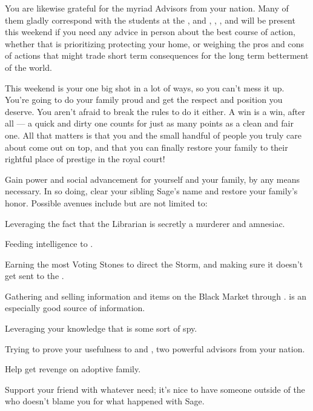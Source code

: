 \documentclass[char]{GL2020}
\begin{document}
You are likewise grateful for the myriad Advisors from your nation. Many of them gladly correspond with the students at the \pSchool{}, and \cEvil{\full}, \cWildCard{\full}, \cHedonist{\full}, and \cCurse{\full} will be present this weekend if you need any advice in person about the best course of action, whether that is prioritizing protecting your home, or weighing the pros and cons of actions that might trade short term consequences for the long term betterment of the world.

This weekend is your one big shot in a lot of ways, so you can't mess it up. You're going to do your family proud and get the respect and position you deserve. You aren't afraid to break the rules to do it either. A win is a win, after all — a quick and dirty one counts for just as many points as a clean and fair one. All that matters is that you and the small handful of people you truly care about come out on top, and that you can finally restore your family to their rightful place of prestige in the royal court! 

\begin{itemz}
    \item Gain power and social advancement for yourself and your family, by any means necessary. In so doing, clear your sibling Sage’s name and restore your family’s honor. Possible avenues include but are not limited to:
    \begin{\itemize}
        \item Leveraging the fact that the Librarian is secretly a murderer and amnesiac.
        \item Feeding intelligence to \cHistory{}.
        \item Earning the most Voting Stones to direct the Storm, and making sure it doesn't get sent to the \pFarm{}.
        \item Gathering and selling information and items on the Black Market through \cChupSecond{}. \cEthics{} is an especially good source of information.
        \item Leveraging your knowledge that \cInterpol{} is some sort of spy.
        \item Trying to prove your usefulness to \cEvil{} and \cHedonist{}, two powerful advisors from your nation.
    \end{\itemize}
    \item Help \cAdopted{} get revenge on \cAdopted{\their} adoptive family.
    \item Support your friend \cPresident{} with whatever \cPresident{\they} need\cPresident{\verbs}; it’s nice to have someone outside of the \pFarm{} who doesn’t blame you for what happened with Sage.
   \end{itemz}
\end{document}
